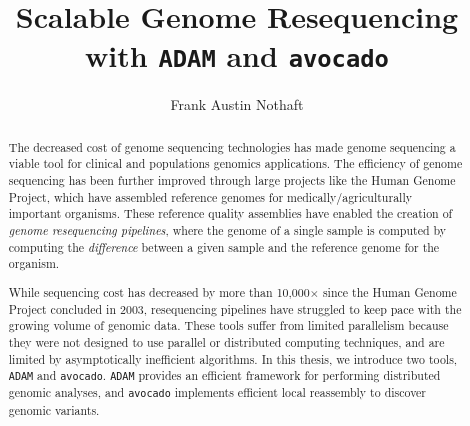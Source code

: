 \documentclass[masters]{ucbthesis}
\begin{document}
\title{Scalable Genome Resequencing with \texttt{ADAM} and \texttt{avocado}}
\author{Frank Austin Nothaft}

\maketitle

\approvalpage
\copyrightpage

\begin{abstract}
The decreased cost of genome sequencing technologies has made genome sequencing a viable
tool for clinical and populations genomics applications. The efficiency of genome sequencing has
been further improved through large projects like the Human Genome Project, which have assembled
reference genomes for medically/agriculturally important organisms. These reference quality assemblies
have enabled the creation of \emph{genome resequencing pipelines}, where the genome of a single
sample is computed by computing the \emph{difference} between a given sample and the reference
genome for the organism.

While sequencing cost has decreased by more than 10,000$\times$ since the Human Genome Project
concluded in 2003, resequencing pipelines have struggled to keep pace with the growing volume of
genomic data. These tools suffer from limited parallelism because they were not designed to use parallel
or distributed computing techniques, and are limited by asymptotically inefficient algorithms. In this thesis,
we introduce two tools, \texttt{ADAM} and \texttt{avocado}. \texttt{ADAM} provides an efficient framework
for performing distributed genomic analyses, and \texttt{avocado} implements efficient local reassembly
to discover genomic variants.
\end{abstract}

\tableofcontents
\end{document}

